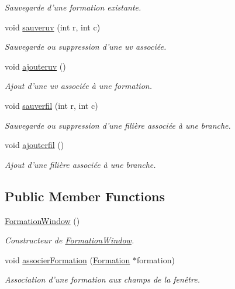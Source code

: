 \begin{DoxyCompactItemize}
\begin{DoxyCompactList}\small\item\em Sauvegarde d'une formation existante. \end{DoxyCompactList}\item 
void \hyperlink{class_formation_window_a6efc5f1397dda264a7044d909d8afeab}{sauveruv} (int r, int c)
\begin{DoxyCompactList}\small\item\em Sauvegarde ou suppression d'une uv associée. \end{DoxyCompactList}\item 
void \hyperlink{class_formation_window_a58b7866f8ef1242df39e33891bdd3dcc}{ajouteruv} ()
\begin{DoxyCompactList}\small\item\em Ajout d'une uv associée à une formation. \end{DoxyCompactList}\item 
void \hyperlink{class_formation_window_a9c5b19cd30fb56ddef12734a2ed68087}{sauverfil} (int r, int c)
\begin{DoxyCompactList}\small\item\em Sauvegarde ou suppression d'une filière associée à une branche. \end{DoxyCompactList}\item 
void \hyperlink{class_formation_window_a315bc4d9e13e94e0c03a778941afe0ea}{ajouterfil} ()
\begin{DoxyCompactList}\small\item\em Ajout d'une filière associée à une branche. \end{DoxyCompactList}\end{DoxyCompactItemize}
\subsection*{Public Member Functions}
\begin{DoxyCompactItemize}
\item 
\hypertarget{class_formation_window_aa440700b3980344aa7099bd3767c9b55}{\hyperlink{class_formation_window_aa440700b3980344aa7099bd3767c9b55}{Formation\-Window} ()}\label{class_formation_window_aa440700b3980344aa7099bd3767c9b55}

\begin{DoxyCompactList}\small\item\em Constructeur de \hyperlink{class_formation_window}{Formation\-Window}. \end{DoxyCompactList}\item 
void \hyperlink{class_formation_window_a0b0eefb2086fee1ac8250cd1aa1eacc5}{associer\-Formation} (\hyperlink{class_formation}{Formation} $\ast$formation)
\begin{DoxyCompactList}\small\item\em Association d'une formation aux champs de la fenêtre. \end{DoxyCompactList}\end{DoxyCompactItemize}
